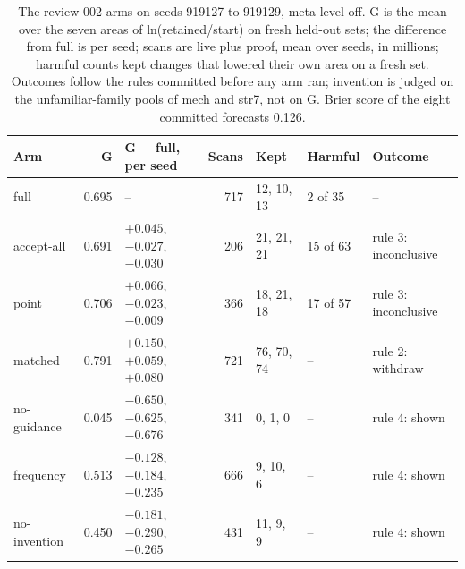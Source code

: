 \begin{table}[t]
\centering
\caption{The review-002 arms on seeds 919127 to 919129, meta-level off. G is the mean over the seven areas of ln(retained/start) on fresh held-out sets; the difference from full is per seed; scans are live plus proof, mean over seeds, in millions; harmful counts kept changes that lowered their own area on a fresh set. Outcomes follow the rules committed before any arm ran; invention is judged on the unfamiliar-family pools of mech and str7, not on G. Brier score of the eight committed forecasts 0.126.}
\label{tab:arms}
\small
\begin{tabular}{lrlrlll}
\toprule
Arm & G & G $-$ full, per seed & Scans & Kept & Harmful & Outcome \\
\midrule
full & 0.695 & -- & 717 & 12, 10, 13 & 2 of 35 & -- \\
accept-all & 0.691 & $+0.045$, $-0.027$, $-0.030$ & 206 & 21, 21, 21 & 15 of 63 & rule 3: inconclusive \\
point & 0.706 & $+0.066$, $-0.023$, $-0.009$ & 366 & 18, 21, 18 & 17 of 57 & rule 3: inconclusive \\
matched & 0.791 & $+0.150$, $+0.059$, $+0.080$ & 721 & 76, 70, 74 & -- & rule 2: withdraw \\
no-guidance & 0.045 & $-0.650$, $-0.625$, $-0.676$ & 341 & 0, 1, 0 & -- & rule 4: shown \\
frequency & 0.513 & $-0.128$, $-0.184$, $-0.235$ & 666 & 9, 10, 6 & -- & rule 4: shown \\
no-invention & 0.450 & $-0.181$, $-0.290$, $-0.265$ & 431 & 11, 9, 9 & -- & rule 4: shown \\
\bottomrule
\end{tabular}
\end{table}
